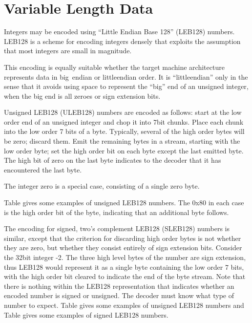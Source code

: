 \section{Variable Length Data}
\label{datarep:variablelengthdata}
Integers may be encoded using ``Little Endian Base 128''
(LEB128) numbers. LEB128 is a scheme for encoding integers
densely that exploits the assumption that most integers are
small in magnitude.

This encoding is equally suitable whether the target machine
architecture represents data in big\dash\  endian or little\dash endian
order. It is ``little\dash endian'' only in the sense that it
avoids using space to represent the ``big'' end of an
unsigned integer, when the big end is all zeroes or sign
extension bits.

Unsigned LEB128 (ULEB128) numbers are encoded as follows:
start at the low order end of an unsigned integer and chop
it into 7\dash bit chunks. Place each chunk into the low order 7
bits of a byte. Typically, several of the high order bytes
will be zero; discard them. Emit the remaining bytes in a
stream, starting with the low order byte; set the high order
bit on each byte except the last emitted byte. The high bit
of zero on the last byte indicates to the decoder that it
has encountered the last byte.

The integer zero is a special case, consisting of a single
zero byte.

Table 
gives some examples of unsigned LEB128 numbers. The
0x80 in each case is the high order bit of the byte, indicating
that an additional byte follows.


The encoding for signed, two’s complement LEB128 (SLEB128)
numbers is similar, except that the criterion for discarding
high order bytes is not whether they are zero, but whether
they consist entirely of sign extension bits. Consider the
32\dash bit integer -2. The three high level bytes of the number
are sign extension, thus LEB128 would represent it as a single
byte containing the low order 7 bits, with the high order
bit cleared to indicate the end of the byte stream. Note
that there is nothing within the LEB128 representation that
indicates whether an encoded number is signed or unsigned. The
decoder must know what type of number to expect. 
Table 
gives some examples of unsigned LEB128 numbers and 
Table 
gives some examples of signed LEB128 numbers.

